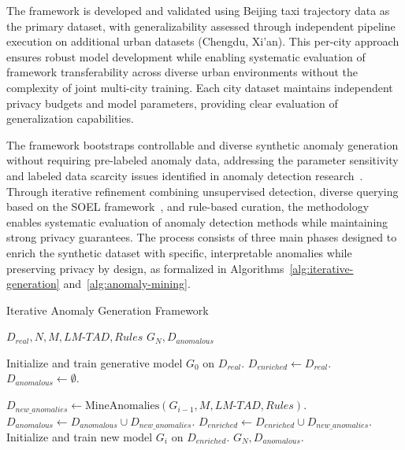 \documentclass[runningheads]{llncs}
\begin{document}
The framework is developed and validated using Beijing taxi trajectory data as the primary dataset, with generalizability assessed through independent pipeline execution on additional urban datasets (Chengdu, Xi'an). This per-city approach ensures robust model development while enabling systematic evaluation of framework transferability across diverse urban environments without the complexity of joint multi-city training. Each city dataset maintains independent privacy budgets and model parameters, providing clear evaluation of generalization capabilities.

The framework bootstraps controllable and diverse synthetic anomaly generation without requiring pre-labeled anomaly data, addressing the parameter sensitivity and labeled data scarcity issues identified in anomaly detection research~\cite{zhangIBATDetectingAnomalous2011}. Through iterative refinement combining unsupervised detection, diverse querying based on the SOEL framework~\cite{liDeepAnomalyDetection2023}, and rule-based curation, the methodology enables systematic evaluation of anomaly detection methods while maintaining strong privacy guarantees. The process consists of three main phases designed to enrich the synthetic dataset with specific, interpretable anomalies while preserving privacy by design, as formalized in Algorithms~\ref{alg:iterative-generation} and~\ref{alg:anomaly-mining}.

\begin{algorithm}[h!]
\caption{Iterative Anomaly Generation Framework}\label{alg:iterative-generation}
\begin{algorithmic}[1]
\Require $D_{real}, N, M, LM\text{-}TAD, Rules$
\Ensure $G_N, D_{anomalous}$

\State Initialize and train generative model $G_0$ on $D_{real}$.
\State $D_{enriched} \gets D_{real}$.
\State $D_{anomalous} \gets \emptyset$.

    \State $D_{new\_anomalies} \gets \text{MineAnomalies}(G_{i-1}, M, LM\text{-}TAD, Rules)$.
    \State $D_{anomalous} \gets D_{anomalous} \cup D_{new\_anomalies}$.
    \State $D_{enriched} \gets D_{enriched} \cup D_{new\_anomalies}$.
    \State Initialize and train new model $G_i$ on $D_{enriched}$.
\EndFor
\State \Return $G_N, D_{anomalous}$.
\end{algorithmic}
\end{algorithm}
\end{document}

